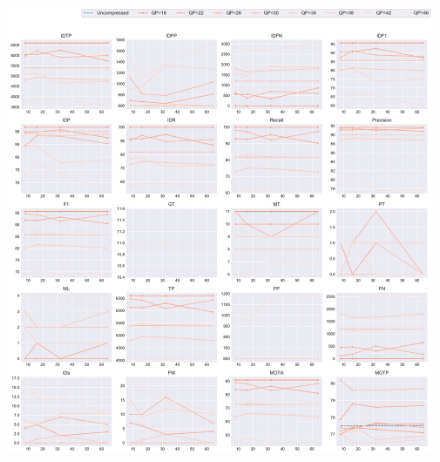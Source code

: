 \begin{figure}[!htbp]
\centering
\includegraphics[width=1.0\linewidth]{img/appendix/Johnny_all_multiplots_msr.pdf}
\caption[Result of all object classes in Class E Johnny with Horizontal Axis of MSR]{}
\label{fig:Johnny_all_msr}
\end{figure}



